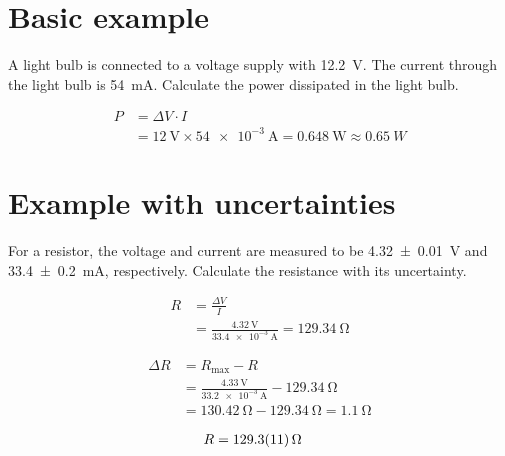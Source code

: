 \documentclass{article}
\begin{document}
\section{Basic example}
A light bulb is connected to a voltage supply with \qty{12.2}{\V}. 
The current through the light bulb is \qty{54}{\milli\A}.
Calculate the power dissipated in the light bulb.

\begin{align}
    P &= \Delta V \cdot I \\
    &= \qty{12}{\V} \times \qty{54e-3}{\A} = \qty{0.648}{\W} \approx \qty{0.65}{W}
\end{align}

\section{Example with uncertainties}
For a resistor, the voltage and current are measured to be
 \qty{4.32+-0.01}{\V} and \qty{33.4+-0.2}{\milli\A}, respectively.
 Calculate the resistance with its uncertainty.

 \begin{align}
    R &= \frac{\Delta V}{I} \\
    &= \frac{\qty{4.32}{\V}}{\qty{33.4e-3}{\A}} = \qty{129.34}{\ohm}
 \end{align}

 \begin{align}
    \Delta R &= R_\textrm{max} - R \\
    &= \frac{\qty{4.33}{\V}}{\qty{33.2e-3}{\A}} - \qty{129.34}{\ohm} \\
    &= \qty{130.42}{\ohm} - \qty{129.34}{\ohm} = \qty{1.1}{\ohm}
 \end{align}

 \begin{align}
    R &= \qty{129.3+-1.1}{\ohm}
 \end{align}
\end{document}
